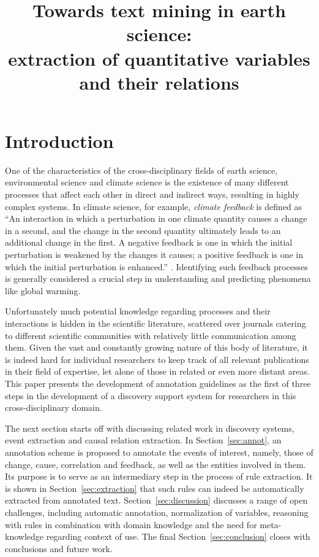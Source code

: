 \documentclass[10pt, a4paper]{article}
\title{Towards text mining in earth science:\\
extraction of quantitative variables and their relations}
\begin{document}
\maketitleabstract

\section{Introduction}

One of the characteristics of the cross-disciplinary fields of earth science, environmental science and climate science is the existence of many different processes that affect each other in direct and indirect ways, resulting in highly complex systems.
In climate science, for example, \emph{climate feedback} is defined as ``An interaction in which a perturbation in one climate quantity causes a change in a second, and the change in the
second quantity ultimately leads to an additional change in the first. 
A negative feedback is one in which the initial perturbation is weakened
by the changes it causes; a positive feedback is one in which the initial
perturbation is enhanced.'' \cite{stocker2013climate}.
Identifying such feedback processes is generally considered a crucial step in understanding and predicting phenomena like global warming.

Unfortunately much potential knowledge regarding processes and their interactions is hidden in the scientific literature, scattered over journals catering to different scientific communities with relatively little communication among them.
Given the vast and constantly growing nature of this body of literature, it is indeed hard for individual researchers to keep track of all relevant publications in their field of expertise, let alone of those in related or even more distant areas.   
This paper presents the development of annotation guidelines as the first of three steps in the development of a discovery support system for researchers in this cross-disciplinary domain.

The next section starts off with discussing related work in discovery systems, event extraction and causal relation extraction.
In Section~\ref{sec:annot}, an annotation scheme is proposed to annotate the events of interest, namely, those of change, cause, correlation and feedback, as well as the entities involved in them.
Its purpose is to serve as an intermediary step in the process of rule extraction.
It is shown in Section~\ref{sec:extraction} that such rules can indeed be automatically extracted from annotated text.
Section~\ref{sec:discussion} discusses a range of open challenges, including automatic annotation, normalization of variables, reasoning with rules in combination with domain knowledge and the need for meta-knowledge regarding context of use.
The final Section~\ref{sec:conclusion} closes with conclusions and future work.
\end{document}
